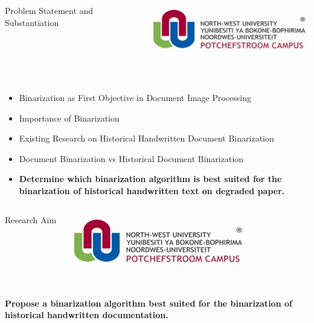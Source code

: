 \documentclass[11pt]{beamer}
\begin{document}
	\begin{frame}[t]
		\begin{columns}[onlytextwidth]
				\begin{Large}
					\vspace{-0.2cm}
					\hspace{-0.5cm}\color{beamer@maroon}Problem Statement and Substantiation
				\end{Large}
			\column{0.25\textwidth}
				\includegraphics[scale=0.4]{nwulogo.jpeg}
		\end{columns}
		\hspace{0.1cm}
		\newline
		\noindent\makebox[\linewidth]{\rule{\paperwidth}{0.4pt}}\\
		[0.8cm]
		\begin{itemize}
			\item Binarization as First Objective in Document Image Processing%
			\item Importance of Binarization %
			\item Existing Research on Historical Handwritten Document Binarization
			\item Document Binarization vs Historical Document Binarization
			\item<2-> \textbf{Determine which binarization algorithm is best suited for the binarization of historical handwritten text on degraded paper.}
		\end{itemize}
	\end{frame}
	
	
	\begin{frame}[t]
		\begin{columns}[onlytextwidth]
			\column{0.75\textwidth}
				\begin{Large}
					\vspace{-0.2cm}
					\color{beamer@maroon}Research Aim
				\end{Large}
				\includegraphics[scale=0.4]{nwulogo.jpeg}
		\end{columns}
		\hspace{0.1cm}
		\newline
		\noindent\makebox[\linewidth]{\rule{\paperwidth}{0.4pt}}\\
		[2cm]
		\textbf{Propose a binarization algorithm best suited for the binarization of historical handwritten documentation.} 
	\end{frame}
\end{document}
